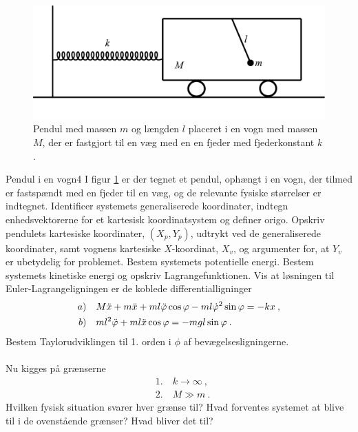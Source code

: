 %
%
\begin{figure}[h!]
\centering
\includegraphics[width=\columnwidth]{Analytisk-Mekanik/PendulIVognOpg.pdf}
\caption{Pendul med massen $m$ og længden $l$ placeret i en vogn med massen $M$, der er fastgjort til en væg med en en fjeder med fjederkonstant $k$.}
\label{fig:PendulIVognOpg}
\end{figure} 
%
%
\begin{opgave}{Pendul i en vogn}{4}
I figur \ref{fig:PendulIVognOpg} er der tegnet et pendul, ophængt i en vogn, der tilmed er fastspændt med en fjeder til en væg, og de relevante fysiske størrelser er indtegnet.
\opg Identificer systemets generaliserede koordinater, indtegn enhedsvektorerne for et kartesisk koordinatsystem og definer origo. %
\opg Opskriv pendulets kartesiske koordinater, $(X_p,Y_p)$, udtrykt ved de generaliserede koordinater, samt vognens kartesiske $X$-koordinat, $X_v$, og argumenter for, at $Y_v$ er ubetydelig for problemet.
\opg Bestem systemets potentielle energi.
\opg Bestem systemets kinetiske energi og opskriv Lagrangefunktionen. %
\opg Vis at løsningen til Euler-Lagrangeligningen er de koblede differentialligninger
\begin{align*}
a&) \quad M\ddot{x} + m\ddot{x} + ml\ddot{\varphi}\cos\varphi - ml\dot{\varphi}^2\sin\varphi = -kx \:, \\
b&) \quad ml^2\ddot{\varphi} + ml\ddot{x}\cos\varphi = -mgl\sin\varphi \: .
\end{align*}
\opg Bestem Taylorudviklingen til 1. orden i $\phi$ af bevægelsesligningerne. \\ \\
Nu kigges på grænserne
\begin{align*}
&1. \quad k \rightarrow \infty \: ,\\
&2. \quad M \gg m \: .
\end{align*}
\opg Hvilken fysisk situation svarer hver grænse til?
\opg Hvad forventes systemet at blive til i de ovenstående grænser?
\opg Hvad bliver det til?
\end{opgave}
\newpage
%
%
